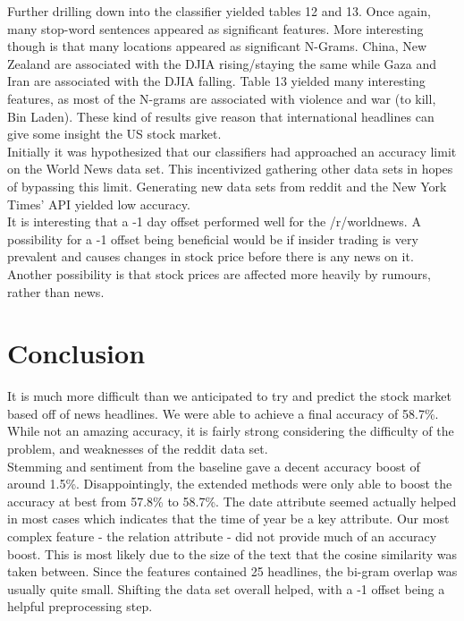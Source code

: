 \documentclass[11pt,a4paper]{article}
\begin{document}
Further drilling down into the classifier yielded tables 12 and 13. Once again, many stop-word sentences appeared as significant features. More interesting though is that many locations appeared as significant N-Grams. China, New Zealand are associated with the DJIA rising/staying the same while Gaza and Iran are associated with the DJIA falling. Table 13 yielded many interesting features, as most of the N-grams are associated with violence and war (to kill, Bin Laden). These kind of results give reason that international headlines can give some insight the US stock market.\\

Initially it was hypothesized that our classifiers had approached an accuracy limit on the World News data set. This incentivized gathering other data sets in hopes of bypassing this limit. Generating new data sets from reddit and the New York Times' API yielded low accuracy.\\

It is interesting that a -1 day offset performed well for the /r/worldnews. A possibility for a -1 offset being beneficial would be if insider trading is very prevalent and causes changes in stock price before there is any news on it. Another possibility is that stock prices are affected more heavily by rumours, rather than news.\\

\section{Conclusion}
It is much more difficult than we anticipated to try and predict the stock market based off of news headlines. We were able to achieve a final accuracy of 58.7\%. While not an amazing accuracy, it is fairly strong considering the difficulty of the problem, and weaknesses of the reddit data set.\\

Stemming and sentiment from the baseline gave a decent accuracy boost of around 1.5\%. Disappointingly, the extended methods were only able to boost the accuracy at best from 57.8\% to 58.7\%. The date attribute seemed actually helped in most cases which indicates that the time of year be a key attribute. Our most complex feature - the relation attribute - did not provide much of an accuracy boost. This is most likely due to the size of the text that the cosine similarity was taken between. Since the features contained 25 headlines, the bi-gram overlap was usually quite small. Shifting the data set overall helped, with a -1 offset being a helpful preprocessing step. \\
\end{document}
